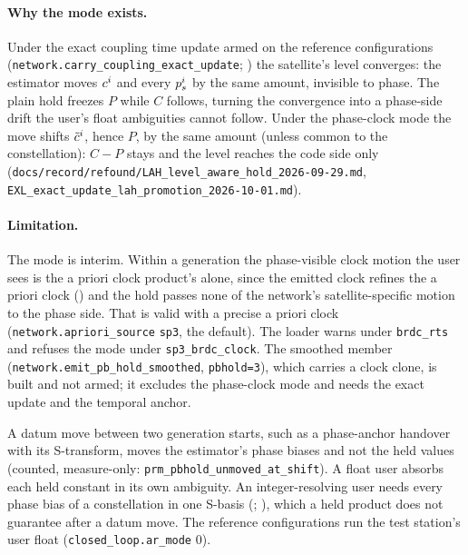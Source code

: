 \documentclass[main.tex]{subfiles}
\begin{document}
\paragraph{Why the mode exists.}
Under the exact coupling time update armed on the reference configurations
(\texttt{network.carry\_coupling\_exact\_update};
) the
satellite's level converges: the estimator moves $c^i$ and every
$p^i_s$ by the same amount, invisible to phase. The plain hold
freezes $P$ while $C$ follows, turning the convergence into a phase-side
drift the user's float ambiguities cannot follow. Under the phase-clock
mode the move shifts $\tilde c^i$, hence $P$, by the same amount (unless
common to the constellation): $C - P$ stays and the level reaches the code
side only
(\texttt{docs/record/refound/LAH\_level\_aware\_hold\_2026-09-29.md},
\texttt{EXL\_exact\_update\_lah\_promotion\_2026-10-01.md}).

\paragraph{Limitation.}
The mode is interim. Within a generation the phase-visible clock motion
the user sees is the a priori clock product's alone, since the emitted
clock refines the a priori clock () and the hold passes none of the network's
satellite-specific motion to the phase side. That is valid with a precise
a priori clock (\texttt{network.apriori\_source} \texttt{sp3}, the
default). The loader warns under \texttt{brdc\_rts} and refuses the mode
under \texttt{sp3\_brdc\_clock}. The smoothed member
(\texttt{network.emit\_pb\_hold\_smoothed}, \texttt{pbhold=3}), which
carries a clock clone, is built and not armed; it excludes the phase-clock
mode and needs the exact update and the temporal anchor.

\begin{remark}
A datum move between two generation starts, such as a phase-anchor
handover with its S-transform, moves the estimator's phase biases and not
the held values (counted, measure-only:
\texttt{prm\_pbhold\_unmoved\_at\_shift}). A float user absorbs each
held constant in its own ambiguity. An integer-resolving user needs
every phase bias of a constellation in one S-basis
(;
\cite{odijk2016estimability}), which a held product does not guarantee after
a datum move. The reference configurations run the test station's user
float (\texttt{closed\_loop.ar\_mode} 0).
\end{remark}
\end{document}
